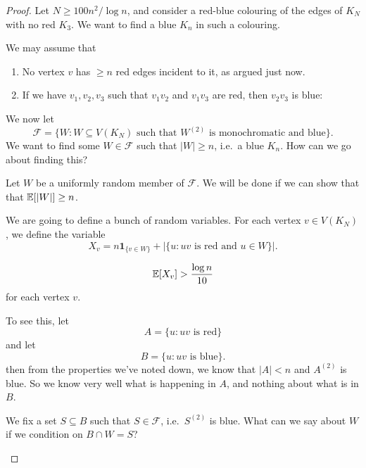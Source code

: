 \documentclass[a4paper]{article}
\begin{document}
\begin{proof}
  Let $N \geq 100n^2/\log n$, and consider a red-blue colouring of the edges of $K_N$ with no red $K_3$. We want to find a blue $K_n$ in such a colouring.

  We may assume that
  \begin{enumerate}
    \item No vertex $v$ has $ \geq n$ red edges incident to it, as argued just now.
    \item If we have $v_1, v_2, v_3$ such that $v_1v_2$ and $v_1 v_3$ are red, then $v_2 v_3$ is blue:
      \begin{center}
      \end{center}
  \end{enumerate}
  We now let
  \[
    \mathcal{F} = \{W : W \subseteq V(K_N)\text{ such that }W^{(2)} \text{ is monochromatic and blue}\}.
  \]
  We want to find some $W \in \mathcal{F}$ such that $|W| \geq n$, i.e.\ a blue $K_n$. How can we go about finding this?

  Let $W$ be a uniformly random member of $\mathcal{F}$. We will be done if we can show that that $\mathbb{E}[|W|] \geq n$.

  We are going to define a bunch of random variables. For each vertex $v \in V(K_N)$, we define the variable
  \[
    X_v = n \mathbf{1}_{\{v \in W\}} + |\{u: uv\text{ is red and }u \in W\}|.
  \]
  \begin{claim}
   \[
    \mathbb{E}[X_v] > \frac{\log n}{10}
  \]
  for each vertex $v$.
  \end{claim}
  To see this, let
  \[
    A = \{u: uv \text{ is red}\}
  \]
  and let
  \[
    B = \{u: uv \text{ is blue}\}.
  \]
  then from the properties we've noted down, we know that $|A| < n$ and $A^{(2)}$ is blue. So we know very well what is happening in $A$, and nothing about what is in $B$.

  We fix a set $S \subseteq B$ such that $S \in \mathcal{F}$, i.e.\ $S^{(2)}$ is blue. What can we say about $W$ if we condition on $B \cap W = S$?
  \begin{center}
\end{center}
\end{proof}
\end{document}
